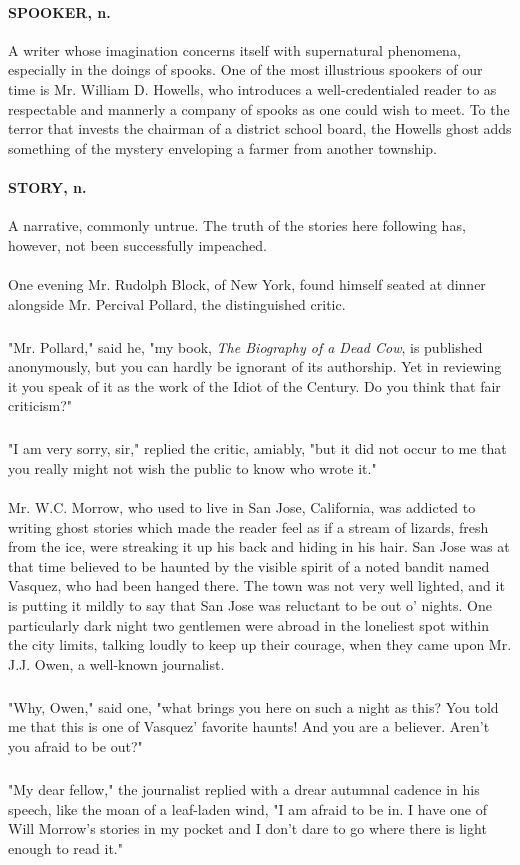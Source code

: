 \documentclass[11pt]{article}
\begin{document}
\paragraph{SPOOKER, n.}  A writer whose imagination concerns itself with
supernatural phenomena, especially in the doings of spooks.  One of
the most illustrious spookers of our time is Mr. William D. Howells,
who introduces a well-credentialed reader to as respectable and
mannerly a company of spooks as one could wish to meet.  To the terror
that invests the chairman of a district school board, the Howells
ghost adds something of the mystery enveloping a farmer from another
township.

\paragraph{STORY, n.}  A narrative, commonly untrue.  The truth of the stories
here following has, however, not been successfully impeached.

\paragraph{}   One evening Mr. Rudolph Block, of New York, found himself seated
at dinner alongside Mr. Percival Pollard, the distinguished critic.
\subparagraph{}   "Mr. Pollard," said he, "my book, {\em The Biography of a Dead Cow},
is published anonymously, but you can hardly be ignorant of its
authorship.  Yet in reviewing it you speak of it as the work of the
Idiot of the Century.  Do you think that fair criticism?"
\subparagraph{}   "I am very sorry, sir," replied the critic, amiably, "but it did
not occur to me that you really might not wish the public to know who
wrote it."
\\
\paragraph{}   Mr. W.C. Morrow, who used to live in San Jose, California, was
addicted to writing ghost stories which made the reader feel as if a
stream of lizards, fresh from the ice, were streaking it up his back
and hiding in his hair.  San Jose was at that time believed to be
haunted by the visible spirit of a noted bandit named Vasquez, who had
been hanged there.  The town was not very well lighted, and it is
putting it mildly to say that San Jose was reluctant to be out o'
nights.  One particularly dark night two gentlemen were abroad in the
loneliest spot within the city limits, talking loudly to keep up their
courage, when they came upon Mr. J.J. Owen, a well-known journalist.
\subparagraph{}   "Why, Owen," said one, "what brings you here on such a night as
this?  You told me that this is one of Vasquez' favorite haunts!  And
you are a believer.  Aren't you afraid to be out?"
\subparagraph{}   "My dear fellow," the journalist replied with a drear autumnal
cadence in his speech, like the moan of a leaf-laden wind, "I am
afraid to be in.  I have one of Will Morrow's stories in my pocket and
I don't dare to go where there is light enough to read it."
\\
\end{document}
